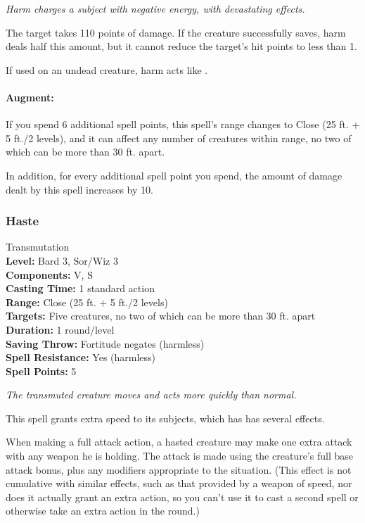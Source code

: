 \emph{Harm charges a subject with negative energy, with devastating effects.} 

The target takes 110 points of damage.
If the creature successfully saves, harm deals half this amount, but it cannot reduce the target's hit points to less than 1.

If used on an undead creature, harm acts like .

\paragraph{Augment:} If you spend 6 additional spell points, 
this spell's range changes to Close (25 ft. + 5 ft./2 levels), and it can affect any number of creatures within range,
no two of which can be more than 30 ft. apart.

In addition, for every additional spell point you spend, the amount of damage dealt by this spell increases by 10.
\subsubsection{Haste}
\label{Spell:Haste}
Transmutation
\\ \textbf{Level:} Bard 3, Sor/Wiz 3
\\ \textbf{Components:} V, S
\\ \textbf{Casting Time:} 1 standard action
\\ \textbf{Range:} Close (25 ft. + 5 ft./2 levels)
\\ \textbf{Targets:} Five creatures, no two of which can be more than 30 ft. apart
\\ \textbf{Duration:} 1 round/level
\\ \textbf{Saving Throw:} Fortitude negates (harmless)
\\ \textbf{Spell Resistance:} Yes (harmless)
\\ \textbf{Spell Points:} 5

\emph{The transmuted creature moves and acts more quickly than normal.} 

This spell grants extra speed to its subjects, which has has several effects.

When making a full attack action, a hasted creature may make one extra attack with any weapon he is holding. 
The attack is made using the creature's full base attack bonus, plus any modifiers appropriate to the situation. 
(This effect is not cumulative with similar effects, such as that provided by a weapon of speed, nor does it actually grant an extra action, so you can't use it to cast a second spell or otherwise take an extra action in the round.)

